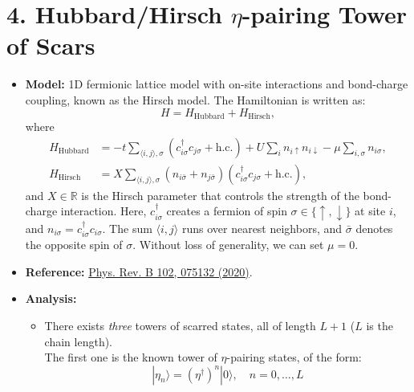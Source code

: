 \documentclass[11pt]{article}
\begin{document}
\section*{4. Hubbard/Hirsch $\eta$-pairing Tower of Scars}
\begin{itemize}
  \item \textbf{Model:} 1D fermionic lattice model with on-site interactions and bond-charge coupling, known as the Hirsch model. The Hamiltonian is written as:
    \begin{equation}
    H = H_{\text{Hubbard}} + H_{\text{Hirsch}},
    \end{equation}
    where
    \begin{align}\label{eqh}
    H_{\text{Hubbard}} &= - t \sum_{\langle i, j \rangle, \sigma} \left( c^\dagger_{i\sigma} c_{j\sigma} + \text{h.c.} \right) + U \sum_i n_{i\uparrow} n_{i\downarrow} - \mu \sum_{i, \sigma} n_{i\sigma}, \\
    H_{\text{Hirsch}} &= X \sum_{\langle i, j \rangle, \sigma} \left( n_{i\bar{\sigma}} + n_{j\bar{\sigma}} \right) \left( c^\dagger_{i\sigma} c_{j\sigma} + \text{h.c.} \right),
    \end{align}
    and \( X \in \mathbb{R} \) is the Hirsch parameter that controls the strength of the bond-charge interaction. Here, \( c^\dagger_{i\sigma} \) creates a fermion of spin \( \sigma \in \{\uparrow, \downarrow\} \) at site \( i \), and \( n_{i\sigma} = c^\dagger_{i\sigma} c_{i\sigma} \). The sum \( \langle i, j \rangle \) runs over nearest neighbors, and \( \bar{\sigma} \) denotes the opposite spin of \( \sigma \). Without loss of generality, we can set $\mu=0$.

    \item \textbf{Reference:} \href{https://journals.aps.org/prb/abstract/10.1103/PhysRevB.102.075132}{Phys. Rev. B 102, 075132 (2020)}.

    \item \textbf{Analysis:}\\
    
    \begin{itemize} 
    
    \item There exists \textit{three} towers of scarred states, all of length $L+1$ ($L$ is the chain length).\\
    The first one is the known tower of $\eta$-pairing states, of the form:
    \begin{equation}
    |\eta_n\rangle = (\eta^\dag)^n |0\rangle, \quad n = 0,\hdots,L
    \end{equation}
    

\end{itemize}
\end{itemize}
\end{document}
